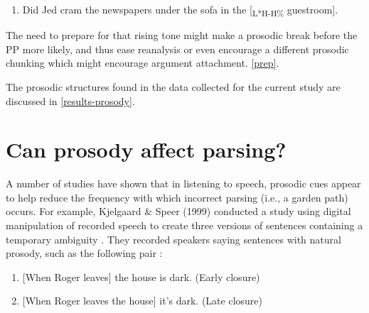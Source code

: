 \documentclass[12pt,oneside]{book}
\providecommand{\tightlist}{%
  \setlength{\itemsep}{0pt}\setlength{\parskip}{0pt}}
\begin{document}
\begin{enumerate}
\def\labelenumi{(\arabic{enumi})}
\setcounter{enumi}{26}
\tightlist
\item
  Did Jed cram the newspapers under the sofa in the {[}\textsubscript{L*H-H\%} guestroom{]}.
\end{enumerate}

The need to prepare for that  rising tone might make a prosodic break before the PP more likely, and thus ease reanalysis or even encourage a different prosodic chunking which might encourage argument attachment.  \ref{prep}.


The prosodic structures found in the data collected for the current study are discussed in \ref{results-prosody}.

\hypertarget{can-prosody-affect-parsing}{%
\section{Can prosody affect parsing?}\label{can-prosody-affect-parsing}}

A number of studies have shown that in listening to speech, prosodic cues appear to help reduce the frequency with which incorrect parsing (i.e., a garden path) occurs. For example, Kjelgaard \& Speer (1999) conducted a study using digital manipulation of recorded speech to create three versions of sentences containing a  temporary ambiguity  . They recorded speakers saying sentences with natural prosody, such as the following pair :

\begin{enumerate}
\def\labelenumi{(\arabic{enumi})}
\setcounter{enumi}{27}
\tightlist
\item
  {[}When Roger leaves{]} the house is dark. (Early closure)
\item
  {[}When Roger leaves the house{]} it's dark. (Late closure)
\end{enumerate}
\end{document}
